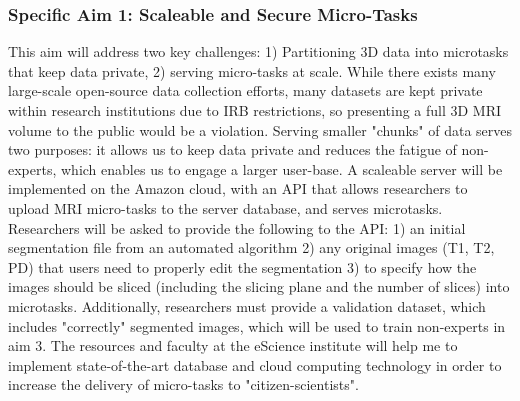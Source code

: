 \subsubsection*{Specific Aim 1: Scaleable and Secure Micro-Tasks}

This aim will address two key challenges: 1) Partitioning 3D data into microtasks that keep data private, 2) serving micro-tasks at scale. While there exists many large-scale open-source data collection efforts, many datasets are kept private within research institutions due to  IRB restrictions, so presenting a full 3D MRI volume to the public would be a violation. Serving smaller "chunks" of data serves two purposes: it allows us to keep data private and reduces the fatigue of non-experts, which enables us to engage a larger user-base. A scaleable server will be implemented on the Amazon cloud, with an API that allows researchers to upload MRI micro-tasks to the server database, and serves microtasks. Researchers will be asked to provide the following to the API: 1) an initial segmentation file from an automated algorithm 2) any original images (T1, T2, PD) that  users need to properly edit the segmentation 3) to specify how the images should be sliced (including the slicing plane and the number of slices) into microtasks. Additionally, researchers must provide a validation dataset, which includes "correctly" segmented images, which will be used to train non-experts in aim 3. The resources and faculty at the eScience institute will help me to implement state-of-the-art database and cloud computing technology in order to increase the delivery of micro-tasks to "citizen-scientists".